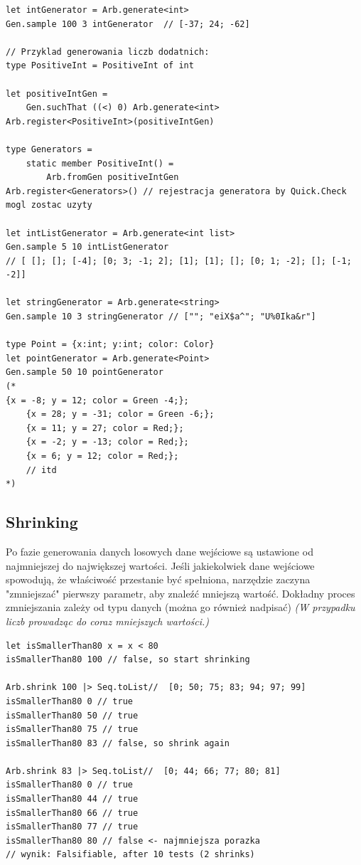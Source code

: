 \lstset{language=FSharp, basicstyle=\scriptsize\ttfamily}
\begin{lstlisting}[frame=single,caption={Przykład generatora dla liczb dodatnich},label=kod:listingA]
let intGenerator = Arb.generate<int>
Gen.sample 100 3 intGenerator  // [-37; 24; -62]

// Przyklad generowania liczb dodatnich:
type PositiveInt = PositiveInt of int

let positiveIntGen =
    Gen.suchThat ((<) 0) Arb.generate<int>
Arb.register<PositiveInt>(positiveIntGen)

type Generators =
    static member PositiveInt() =
        Arb.fromGen positiveIntGen
Arb.register<Generators>() // rejestracja generatora by Quick.Check mogl zostac uzyty

let intListGenerator = Arb.generate<int list>
Gen.sample 5 10 intListGenerator 
// [ []; []; [-4]; [0; 3; -1; 2]; [1]; [1]; []; [0; 1; -2]; []; [-1; -2]]

let stringGenerator = Arb.generate<string>
Gen.sample 10 3 stringGenerator // [""; "eiX$a^"; "U%0Ika&r"]

type Point = {x:int; y:int; color: Color}
let pointGenerator = Arb.generate<Point>
Gen.sample 50 10 pointGenerator
(*
{x = -8; y = 12; color = Green -4;};
    {x = 28; y = -31; color = Green -6;};
    {x = 11; y = 27; color = Red;};
    {x = -2; y = -13; color = Red;};
    {x = 6; y = 12; color = Red;};
    // itd
*)
\end{lstlisting}

\subsection{Shrinking}

Po fazie generowania danych losowych dane wejściowe są ustawione od najmniejszej do największej wartości. Jeśli jakiekolwiek dane wejściowe spowodują, że właściwość przestanie być spełniona, narzędzie zaczyna "zmniejszać" pierwszy parametr, aby znaleźć mniejszą wartość. Dokładny proces zmniejszania zależy od typu danych (można go również nadpisać) \textit{(W przypadku liczb prowadząc do coraz mniejszych wartości.)}

\lstset{language=FSharp, basicstyle=\scriptsize}
\begin{lstlisting}[frame=single,caption={Przykład shrinking na liczbach},label=kod:listingA]
let isSmallerThan80 x = x < 80
isSmallerThan80 100 // false, so start shrinking

Arb.shrink 100 |> Seq.toList//  [0; 50; 75; 83; 94; 97; 99]
isSmallerThan80 0 // true
isSmallerThan80 50 // true
isSmallerThan80 75 // true
isSmallerThan80 83 // false, so shrink again

Arb.shrink 83 |> Seq.toList//  [0; 44; 66; 77; 80; 81]
isSmallerThan80 0 // true
isSmallerThan80 44 // true
isSmallerThan80 66 // true
isSmallerThan80 77 // true
isSmallerThan80 80 // false <- najmniejsza porazka
// wynik: Falsifiable, after 10 tests (2 shrinks)
\end{lstlisting}

